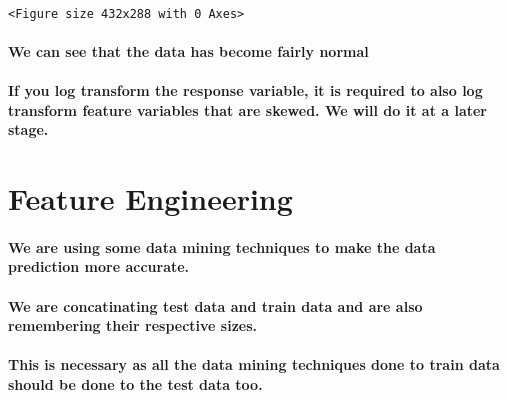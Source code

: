\documentclass[11pt]{article}
\begin{document}
    \begin{center}
    \end{center}
    { \hspace*{\fill} \\}
    
    
    \begin{verbatim}
<Figure size 432x288 with 0 Axes>
    \end{verbatim}

    
    \paragraph{We can see that the data has become fairly
normal}\label{we-can-see-that-the-data-has-become-fairly-normal}

\paragraph{If you log transform the response variable, it is required to
also log transform feature variables that are skewed. We will do it at a
later
stage.}\label{if-you-log-transform-the-response-variable-it-is-required-to-also-log-transform-feature-variables-that-are-skewed.-we-will-do-it-at-a-later-stage.}

    \section{Feature Engineering}\label{feature-engineering}

\paragraph{We are using some data mining techniques to make the data
prediction more
accurate.}\label{we-are-using-some-data-mining-techniques-to-make-the-data-prediction-more-accurate.}

\paragraph{We are concatinating test data and train data and are also
remembering their respective
sizes.}\label{we-are-concatinating-test-data-and-train-data-and-are-also-remembering-their-respective-sizes.}

\paragraph{This is necessary as all the data mining techniques done to
train data should be done to the test data
too.}\label{this-is-necessary-as-all-the-data-mining-techniques-done-to-train-data-should-be-done-to-the-test-data-too.}
\end{document}
